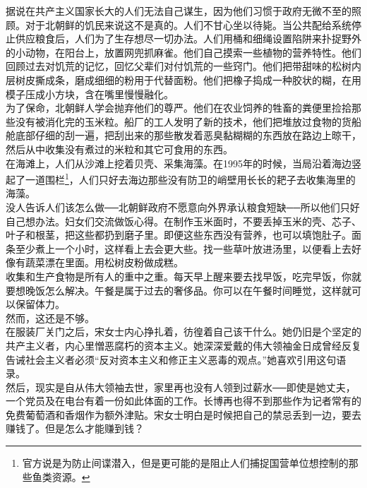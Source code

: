 \ifnum{}
	\begin{multicols}{\theparacolNo}
\fi
据说在共产主义国家长大的人们无法自己谋生，因为他们习惯于政府无微不至的照顾。对于北朝鲜的饥民来说这不是真的。人们不甘心坐以待毙。当公共配给系统停止供应粮食后，人们为了生存想尽一切办法。人们用桶和细绳设置陷阱来扑捉野外的小动物，在阳台上，放置网兜抓麻雀。他们自己摸索一些植物的营养特性。他们回顾过去对饥荒的记忆，回忆父辈们对付饥荒的一些窍门。他们把带甜味的松树内层树皮撕成条，磨成细细的粉用于代替面粉。他们把橡子捣成一种胶状的糊，在用模子压成小方块，含在嘴里慢慢融化。\\

为了保命，北朝鲜人学会抛弃他们的尊严。他们在农业饲养的牲畜的粪便里捡拾那些没有被消化完的玉米粒。船厂的工人发明了新的技术，他们把堆放过食物的货船舱底部仔细的刮一遍，把刮出来的那些散发着恶臭黏糊糊的东西放在路边上晾干，然后从中收集没有煮过的米粒和其它可食用的东西。\\

在海滩上，人们从沙滩上挖着贝壳、采集海藻。在1995年的时候，当局沿着海边竖起了一道围栏\footnote{官方说是为防止间谍潜入，但是更可能的是阻止人们捕捉国营单位想控制的那些鱼类资源。}，人们只好去海边那些没有防卫的峭壁用长长的耙子去收集海里的海藻。\\

没人告诉人们该怎么做──北朝鲜政府不愿意向外界承认粮食短缺──所以他们只好自己想办法。妇女们交流做饭心得。在制作玉米面时，不要丢掉玉米的壳、芯子、叶子和根茎，把这些都扔到磨子里。即便这些东西没有营养，也可以填饱肚子。面条至少煮上一个小时，这样看上去会更大些。找一些草叶放进汤里，以便看上去好像有蔬菜漂在里面。用松树皮粉做成糕。\\

收集和生产食物是所有人的重中之重。每天早上醒来要去找早饭，吃完早饭，你就要想晚饭怎么解决。午餐是属于过去的奢侈品。你可以在午餐时间睡觉，这样就可以保留体力。\\

然而，这还是不够。\\

在服装厂关门之后，宋女士内心挣扎着，彷徨着自己该干什么。她仍旧是个坚定的共产主义者，内心里憎恶腐朽的资本主义。她深深爱戴的伟大领袖金日成曾经反复告诫社会主义者必须“反对资本主义和修正主义恶毒的观点。”她喜欢引用这句语录。\\

然后，现实是自从伟大领袖去世，家里再也没有人领到过薪水──即使是她丈夫，一个党员及在电台有着一份如此体面的工作。长博再也得不到那些作为记者常有的免费葡萄酒和香烟作为额外津贴。宋女士明白是时候把自己的禁忌丢到一边，要去赚钱了。但是怎么才能赚到钱？\\


\end{multicols}
